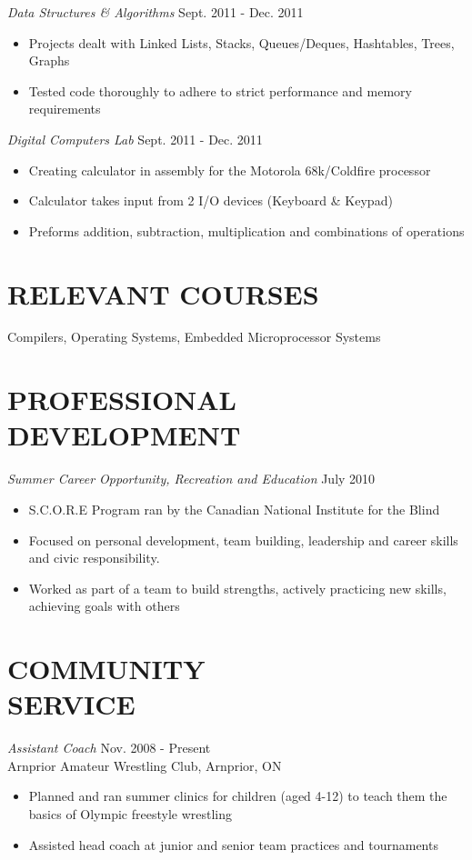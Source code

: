 \documentclass[margin]{res}
\begin{document}
\begin{resume}
{\sl Data Structures \& Algorithms} \hfill Sept. 2011 - Dec. 2011
\begin{itemize} \itemsep -2pt
  \item Projects dealt with Linked Lists, Stacks, Queues/Deques, Hashtables, Trees, Graphs
  \item Tested code thoroughly to adhere to strict performance and memory requirements
\end{itemize}

{\sl Digital Computers Lab} \hfill Sept. 2011 - Dec. 2011
\begin{itemize} \itemsep -2pt
  \item Creating calculator in assembly for the Motorola 68k/Coldfire processor
  \item Calculator takes input from 2 I/O devices (Keyboard \& Keypad)
  \item  Preforms addition, subtraction, multiplication and combinations of operations
\end{itemize}

\section{RELEVANT COURSES} 
Compilers, Operating Systems, Embedded Microprocessor Systems
 
\section{PROFESSIONAL DEVELOPMENT} {\sl Summer Career Opportunity, Recreation and Education} \hfill July 2010
\begin{itemize} \itemsep -2pt
  \item S.C.O.R.E Program ran by the Canadian National Institute for the Blind
  \item Focused on personal development, team building, leadership and career skills and civic responsibility.
  \item Worked as part of a team to build strengths, actively practicing new skills, achieving goals with others
\end{itemize}
 
\section{COMMUNITY \\ SERVICE}  {\sl Assistant Coach} \hfill Nov. 2008 - Present\\
Arnprior Amateur Wrestling Club, Arnprior, ON
\begin{itemize}\itemsep -2pt
  \item Planned and ran summer clinics for children (aged 4-12) to teach them the basics of Olympic freestyle wrestling
  \item Assisted head coach at junior and senior team practices and tournaments 
\end{itemize}


\end{resume}
\end{document}
